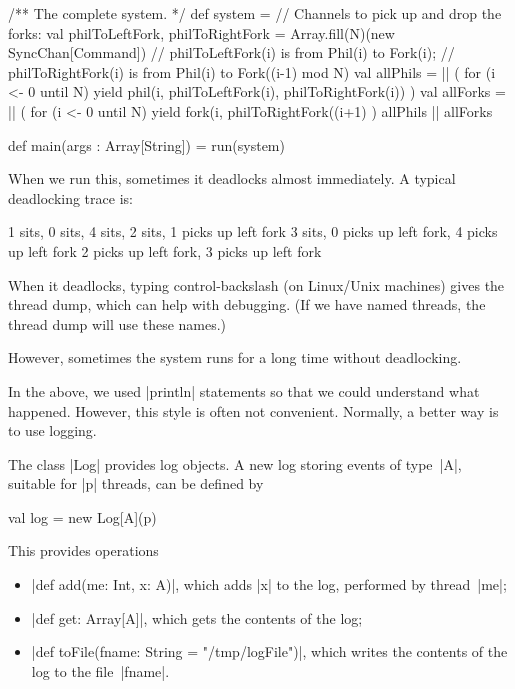 \documentclass[notes,color]{sepslide0}
\begin{document}
\begin{slide}

\begin{scala}
  /** The complete system. */
  def system = {
    // Channels to pick up and drop the forks:
    val philToLeftFork, philToRightFork = Array.fill(N)(new SyncChan[Command])
    // philToLeftFork(i) is from Phil(i) to Fork(i);
    // philToRightFork(i) is from Phil(i) to Fork((i-1) mod N)
    val allPhils = || ( 
      for (i <- 0 until N) yield phil(i, philToLeftFork(i), philToRightFork(i))
    )
    val allForks = || ( 
      for (i <- 0 until N) yield
        fork(i, philToRightFork((i+1)%
    )
    allPhils || allForks
  }

  def main(args : Array[String]) = run(system) 
\end{scala}
\end{slide}


\begin{slide}

When we run this, sometimes it deadlocks almost immediately.
A typical deadlocking trace is:
%
\begin{scala}
1 sits,  0 sits,  4 sits,  2 sits,  1 picks up left fork
3 sits,  0 picks up left fork,  4 picks up left fork
2 picks up left fork,  3 picks up left fork
\end{scala}
%
When it deadlocks, typing control-backslash (on Linux/Unix machines) gives the
thread dump, which can help with debugging.  (If we have named threads, the
thread dump will use these names.)  

However, sometimes the system runs for a long time without deadlocking.
\end{slide}


\begin{slide}

In the above, we used |println| statements so that we could understand
what happened.  However, this style is often not convenient.
Normally, a better way is to use logging.

The class |Log| provides log objects.
%
A new log storing events of type~|A|, suitable for |p| threads,
can be defined by
\begin{scala}
  val log = new Log[A](p)
\end{scala}
%
This provides operations
%
\begin{itemize}
\item |def add(me: Int, x: A)|, which adds |x| to the log,
performed by thread~|me|;

\item |def get: Array[A]|, which gets the contents of the log;

\item |def toFile(fname: String = "/tmp/logFile")|, which writes the
contents of the log to the file~|fname|.
\end{itemize}
\end{slide}
\end{document}
